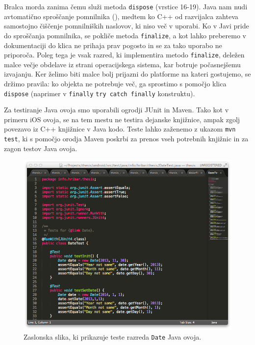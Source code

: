 Bralca morda zanima čemu služi metoda \texttt{dispose} (vrstice 16-19). Java nam nudi avtomatično sproščanje pomnilnika (), medtem ko C++ od razvijalca zahteva samostojno čiščenje pomnilniških naslovov, ki niso več v uporabi. Ko v Javi pride do sproščanja pomnilnika, se pokliče metoda \texttt{finalize}, a kot lahko preberemo v dokumentaciji\cite{android-object} do klica ne prihaja prav pogosto in se za tako uporabo ne priporoča. Poleg tega je vsak razred, ki implementira metodo \texttt{finalize}, deležen malce večje obdelave iz strani operacijskega sistema, kar botruje počasnejšemu izvajanju. Ker želimo biti malce bolj prijazni do platforme na kateri gostujemo, se držimo pravila: ko objekta ne potrebuje več, ga sprostimo s pomočjo klica \texttt{dispose} (naprimer v \texttt{finally} \texttt{try catch finally} konstruktu).

Za testiranje Java ovoja smo uporabili ogrodji JUnit\cite{junit} in Maven\cite{maven}. Tako kot v primeru iOS ovoja, se na tem mestu ne testira dejanske knjižnice, ampak zgolj povezavo iz C++ knjižnice v Java kodo. Teste lahko zaženemo z ukazom \texttt{mvn test}, ki s pomočjo orodja Maven poskrbi za prenos vseh potrebnih knjižnic in za zagon testov Java ovoja.

\begin{figure}
 \includegraphics[width=\linewidth]{java-tests}
 \caption{Zaslonska slika, ki prikazuje teste razreda \texttt{Date} Java ovoja.}
 \label{fig:java-tests}
\end{figure}

